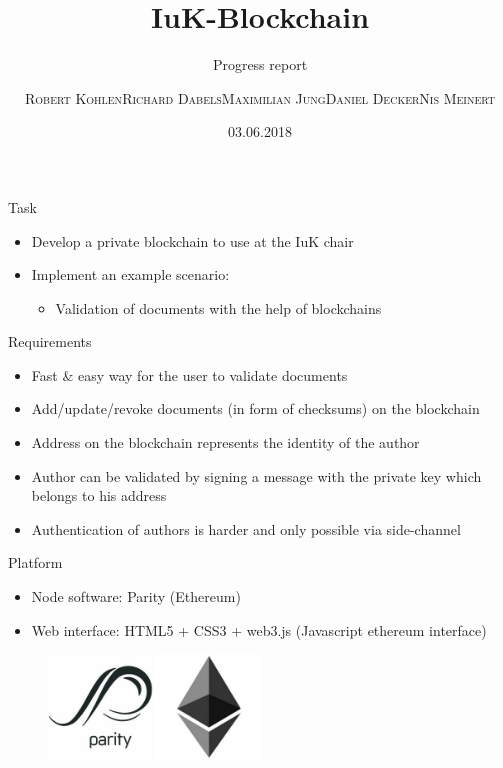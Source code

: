 \documentclass[10pt]{beamer}
\title{IuK-Blockchain}
\subtitle{Progress report}
\author{\textsc{Robert Kohlen}\newline\textsc{Richard Dabels}\newline\textsc{Maximilian Jung}\newline\textsc{Daniel Decker}\newline\textsc{Nis Meinert}}
\date{03.06.2018}
\begin{document}
\begin{frame}
	\titlepage
\end{frame}

\begin{frame}{Task}
	\begin{itemize}
		\item Develop a private blockchain to use at the IuK chair
		\item Implement an example scenario:
		\begin{itemize}
			\item Validation of documents with the help of blockchains
		\end{itemize}
	\end{itemize}
\end{frame}

\begin{frame}{Requirements}
	\begin{itemize}
		\item Fast \& easy way for the user to validate documents
		\item Add/update/revoke documents (in form of checksums) on the blockchain
		\item Address on the blockchain represents the identity of the author
		\item Author can be validated by signing a message with the private key which belongs to his address
		\item Authentication of authors is harder and only possible via side-channel
	\end{itemize}
\end{frame}

\begin{frame}{Platform}
	\begin{itemize}
		\item Node software: Parity (Ethereum)
		\item Web interface: HTML5 + CSS3 + web3.js (Javascript ethereum interface)
	\end{itemize}
	\begin{figure}
		\includegraphics[width=0.5\textwidth]{images/parity-ethereum-logo.png}
	\end{figure}
\end{frame}
\end{document}
